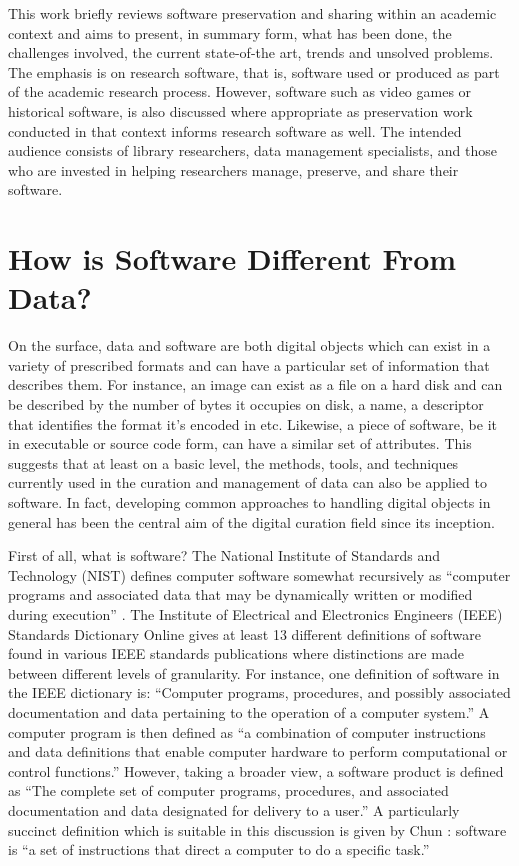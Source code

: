 \documentclass[letterpaper,11pt]{article}
\begin{document}
This work briefly reviews software preservation and sharing within an academic context and aims to present, in summary form, what has been done, the challenges involved, the current state-of-the art, trends and unsolved problems. The emphasis is on research software, that is, software used or produced as part of the academic research process. However, software such as video games or historical software, is also discussed where appropriate as preservation work conducted in that context informs research software as well. The intended audience consists of library researchers, data management specialists, and those who are invested in helping researchers manage, preserve, and share their software.


\section{How is Software Different From Data?}
\label{sec:how-is-sw-diff-from-data}
On the surface, data and software are both digital objects which can exist in a variety of prescribed formats and can have a particular set of information that describes them. For instance, an image can exist as a file on a hard disk and can be described by the number of bytes it occupies on disk, a name, a descriptor that identifies the format it’s encoded in etc. Likewise, a piece of software, be it in executable or source code form, can have a similar set of attributes.  This suggests that at least on a basic level, the methods, tools, and techniques currently used in the curation and management of data can also be applied to software. In fact, developing common approaches to handling digital objects in general has been the central aim of the digital curation field since its inception. 

First of all, what is software? The National Institute of Standards and Technology (NIST) defines computer software somewhat recursively as ``computer programs and associated data that may be dynamically written or modified during execution'' \citep{kissel2013}. The Institute of Electrical and Electronics Engineers (IEEE) Standards Dictionary Online gives at least 13 different definitions of software found in various IEEE standards publications \citep{ieee_standardsDict} where distinctions are made between different levels of granularity. For instance, one definition of software in the IEEE dictionary is: ``Computer programs, procedures, and possibly associated documentation and data pertaining to the operation of a computer system.'' A computer program is then defined as ``a combination of computer instructions and data definitions that enable computer hardware to perform computational or control functions.'' However, taking a broader view, a software product is defined as ``The complete set of computer programs, procedures, and associated documentation and data designated for delivery to a user.''  A particularly succinct definition which is suitable in this discussion is given by Chun \citep{chun2004}: software is ``a set of instructions that direct a computer to do a specific task.''
\end{document}
